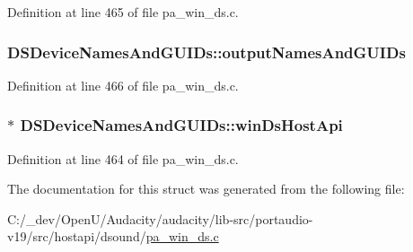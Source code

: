Definition at line 465 of file pa\+\_\+win\+\_\+ds.\+c.

\subsubsection[{\texorpdfstring{output\+Names\+And\+G\+U\+I\+Ds}{outputNamesAndGUIDs}}]{ D\+S\+Device\+Names\+And\+G\+U\+I\+Ds\+::output\+Names\+And\+G\+U\+I\+Ds}\hypertarget{struct_d_s_device_names_and_g_u_i_ds_aa1c6709850286664c45e76a2f3e20326}{}\label{struct_d_s_device_names_and_g_u_i_ds_aa1c6709850286664c45e76a2f3e20326}


Definition at line 466 of file pa\+\_\+win\+\_\+ds.\+c.

\subsubsection[{\texorpdfstring{win\+Ds\+Host\+Api}{winDsHostApi}}]{$\ast$ D\+S\+Device\+Names\+And\+G\+U\+I\+Ds\+::win\+Ds\+Host\+Api}\hypertarget{struct_d_s_device_names_and_g_u_i_ds_ab6d01e9e0b3b7699b23d9ac36113ab37}{}\label{struct_d_s_device_names_and_g_u_i_ds_ab6d01e9e0b3b7699b23d9ac36113ab37}


Definition at line 464 of file pa\+\_\+win\+\_\+ds.\+c.



The documentation for this struct was generated from the following file\+:\begin{DoxyCompactItemize}
\item 
C\+:/\+\_\+dev/\+Open\+U/\+Audacity/audacity/lib-\/src/portaudio-\/v19/src/hostapi/dsound/\hyperlink{pa__win__ds_8c}{pa\+\_\+win\+\_\+ds.\+c}\end{DoxyCompactItemize}
